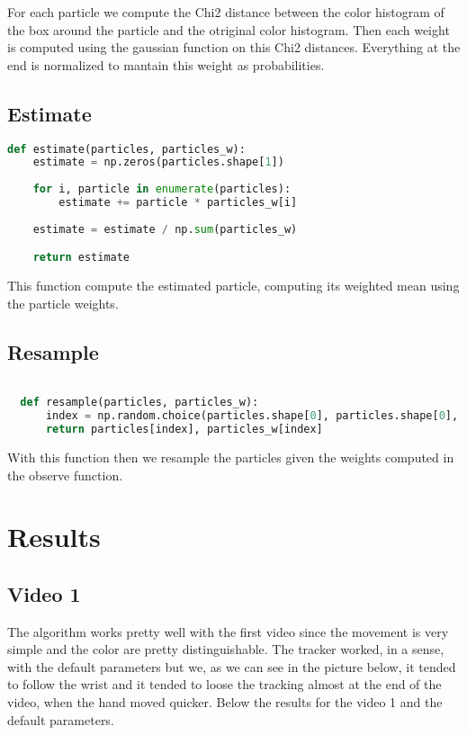 \documentclass{ETHExercise}
\begin{document}
For each particle we compute the Chi2 distance between the color histogram of the box around the particle
and the otriginal color histogram. Then each weight is computed using the gaussian function on this Chi2 distances.
Everything at the end is normalized to mantain this weight as probabilities.

\subsection{Estimate}

\begin{lstlisting}[language=Python, caption=estimate]
  def estimate(particles, particles_w):
    estimate = np.zeros(particles.shape[1])
    
    for i, particle in enumerate(particles):
        estimate += particle * particles_w[i]
        
    estimate = estimate / np.sum(particles_w)

    return estimate
\end{lstlisting}

This function compute the estimated particle, computing its weighted mean using the particle weights.

\subsection{Resample}
\begin{lstlisting}[language=Python, caption=resample]

  def resample(particles, particles_w):
      index = np.random.choice(particles.shape[0], particles.shape[0], p=particles_w)
      return particles[index], particles_w[index]
\end{lstlisting}
With this function then we resample the particles given the weights computed in the observe function.
\section{Results}

\subsection{Video 1}

The algorithm works pretty well with the first video since the movement 
is very simple and the color are pretty distinguishable. The tracker worked, in a sense, with the
default parameters but we, as we can see in the picture below, it tended to follow the wrist and it 
tended to loose the tracking almost at the end of the video, when the hand moved quicker.
Below the results for the video 1 and the default parameters.
\end{document}
